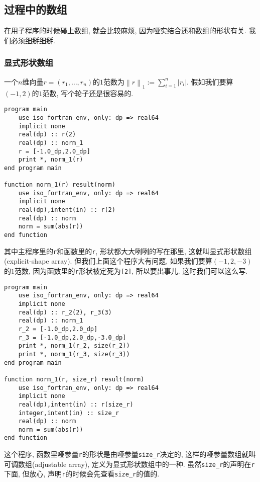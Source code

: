 \subsection{过程中的数组}

在用子程序的时候碰上数组, 就会比较麻烦, 因为哑实结合还和数组的形状有关. 我们必须细掰细掰.

\subsubsection{显式形状数组}
一个$n$维向量$r=(r_1,\dots,r_n)$的$1$范数为$\left\lVert r\right\rVert_1:=\sum_{i=1}^n\left\lvert r_i\right\rvert $. 假如我们要算$(-1,2)$的$1$范数, 写个轮子还是很容易的.
\begin{lstlisting}
program main
    use iso_fortran_env, only: dp => real64
    implicit none
    real(dp) :: r(2)
    real(dp) :: norm_1
    r = [-1.0_dp,2.0_dp]
    print *, norm_1(r)
end program main

function norm_1(r) result(norm)
    use iso_fortran_env, only: dp => real64
    implicit none
    real(dp),intent(in) :: r(2)
    real(dp) :: norm
    norm = sum(abs(r))
end function
\end{lstlisting}
其中主程序里的\texttt{r}和函数里的\texttt{r}, 形状都大大咧咧的写在那里, 这就叫显式形状数组(explicit-shape array). 但我们上面这个程序大有问题, 如果我们要算$(-1,2,-3)$的$1$范数, 因为函数里的\texttt{r}形状被定死为\texttt{[2]}, 所以要出事儿. 这时我们可以这么写.\label{adjustable_array}
\begin{lstlisting}
program main
    use iso_fortran_env, only: dp => real64
    implicit none
    real(dp) :: r_2(2), r_3(3)
    real(dp) :: norm_1
    r_2 = [-1.0_dp,2.0_dp]
    r_3 = [-1.0_dp,2.0_dp,-3.0_dp]
    print *, norm_1(r_2, size(r_2))
    print *, norm_1(r_3, size(r_3))
end program main

function norm_1(r, size_r) result(norm)
    use iso_fortran_env, only: dp => real64
    implicit none
    real(dp),intent(in) :: r(size_r)
    integer,intent(in) :: size_r
    real(dp) :: norm
    norm = sum(abs(r))
end function
\end{lstlisting}
这个程序, 函数里哑参量\texttt{r}的形状是由哑参量\texttt{size\_{}r}决定的, 这样的哑参量数组就叫可调数组(adjustable array), 定义为显式形状数组中的一种. 虽然\texttt{size\_{}r}的声明在\texttt{r}下面, 但放心, 声明\texttt{r}的时候会先查看\texttt{size\_{}r}的值的.

